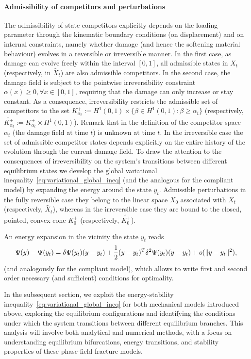 \documentclass[10pt]{article}
\begin{document}
\paragraph{Admissibility of competitors and perturbations}
The admissibility of state competitors explicitly depends on the loading parameter through the kinematic boundary conditions (on displacement) and on internal constraints, namely whether damage (and hence the softening material behaviour)  evolves in a reversible or irreversible manner.
In the first case, as damage can evolve freely within the interval $[0, 1]$, all admissible states in $X_t$  (respectively, in $\widetilde{X_t}$) are also admissible competitors. 
In the second case, the damage field is subject to the pointwise irreversibility constraint $\dot \alpha(x)\geq 0, \forall x\in [0, 1]$, requiring that the damage can only increase or stay constant. 
As a consequence, irreversibility restricts the admissible set of competitors to the set $K^+_{\alpha_t}:=H^1(0, 1) \times \{\beta\in H^1(0, 1): \beta\geq \alpha_t\}$ (respectively, $\widetilde{K^+_{\alpha_t}}:=K^+_{\alpha_t}\times H^1(0, 1)$). 
Remark that in the definition of the competitor space $\alpha_t$ (the damage field at time $t$) is unknown at time $t$. 
In the irreversible case the set of admissible competitor states depends explicitly on the entire history of the evolution through the current damage field.
To draw the attention to the consequences of irreversibility on the system's transitions between different equilibrium states we develop the global variational inequality~\eqref{eq:variational_global_ineq} (and the analogous for the compliant model) by expanding the energy around the state $y_t$. 
Admissible perturbations in the fully reversible case they belong to the linear space $X_0$ associated with  $X_t$ (respectively, $\widetilde{X_t}$), whereas in the irreversible case they are bound to the closed, pointed, convex cone $K^+_0$ (respectively, $\widetilde{K^+_0}$).

An energy expansion in the vicinity the state $y_t$ reads
$$
\Psi(y)-\Psi(y_t)= \delta\Psi(y_t)(y-y_t)+\frac{1}{2}(y-y_t)^T \delta^2\Psi(y_t)(y-y_t)+o(\|y-y_t\|^2),
    \label{eqn:energy-expansion}
$$
%
(and analogously for the compliant model), which allows to write first and second order necessary (and sufficient) conditions for optimality.


%

%

In the subsequent section, we exploit the energy-stability inequality~\eqref{eq:variational_global_ineq} for both mechanical models introduced above, exploring the equilibrium configurations and identifying the conditions under which the system transitions between different equilibrium branches. 
This analysis will involve both analytical and numerical methods, with a focus on understanding equilibrium bifurcations, energy transitions, and stability properties of these phase-field fracture models.
\end{document}
